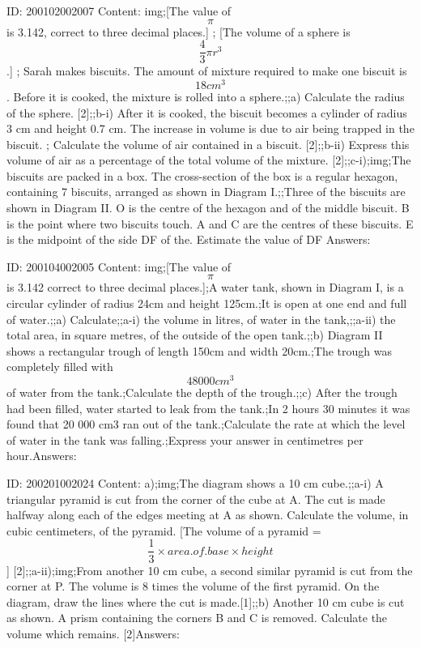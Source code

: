 \documentclass{article}
\begin{document}
ID: 200102002007
Content:
img;[The value of $$\pi$$ is 3.142, correct to three decimal places.] ; [The volume of a sphere is $$\frac{4}{3}\pi r^{3} $$.] ; Sarah makes biscuits. The amount of mixture required to make one biscuit is $$18cm^{3} $$. Before it is cooked, the mixture is rolled into a sphere.;;a) Calculate the radius of the sphere. [2];;b-i) After it is cooked, the biscuit becomes a cylinder of radius 3 cm and height 0.7 cm. The increase in volume is due to air being trapped in the biscuit. ; Calculate the volume of air contained in a biscuit. [2];;b-ii) Express this volume of air as a percentage of the total volume of the mixture. [2];;c-i);img;The biscuits are packed in a box. The cross-section of the box is a regular hexagon, containing 7 biscuits, arranged as shown in Diagram I.;;Three of the biscuits are shown in Diagram II. O is the centre of the hexagon and of the middle biscuit. B is the point where two biscuits touch. A and C are the centres of these biscuits. E is the midpoint of the side DF of the. Estimate the value of DF Answers:

ID: 200104002005
Content:
img;[The value of $$\pi$$ is 3.142 correct to three decimal places.];A water tank, shown in Diagram I, is a circular cylinder of radius 24cm and height 125cm.;It is open at one end and full of water.;;a) Calculate;;a-i) the volume in litres, of water in the tank,;;a-ii) the total area, in square metres, of the outside of the open tank.;;b) Diagram II shows a rectangular trough of length 150cm and width 20cm.;The trough was completely filled with $$48 000cm^3$$ of water from the tank.;Calculate the depth of the trough.;;c) After the trough had been filled, water started to leak from the tank.;In 2 hours 30 minutes it was found that 20 000 cm3 ran out of the tank.;Calculate the rate at which the level of water in the tank was falling.;Express your answer in centimetres per hour.Answers:

ID: 200201002024
Content:
a);img;The diagram shows a 10 cm cube.;;a-i) A triangular pyramid is cut from the corner of the cube at A. The cut is made halfway along each of the edges meeting at A as shown. Calculate the volume, in cubic centimeters, of the pyramid. [The volume of a pyramid = $$\frac{1}{3} \times area.of.base \times height$$] [2];;a-ii);img;From another 10 cm cube, a second similar pyramid is cut from the corner at P. The volume is 8 times the volume of the first pyramid. On the diagram, draw the lines where the cut is made.[1];;b) Another 10 cm cube is cut as shown. A prism containing the corners B and C is removed. Calculate the volume which remains. [2]Answers:
\end{document}
